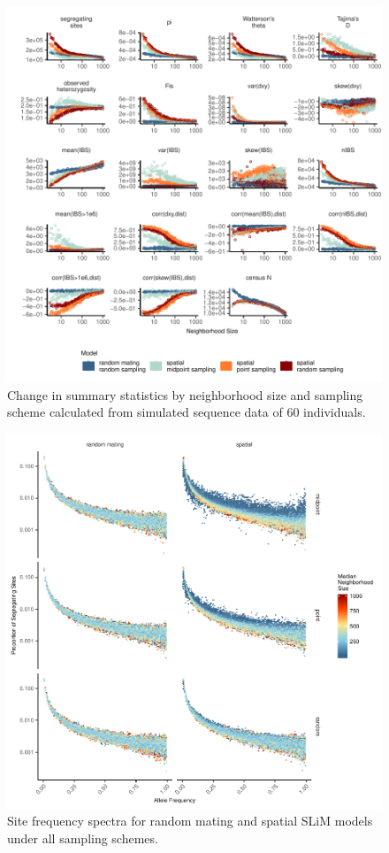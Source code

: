 \documentclass[9pt,twocolumn,twoside,lineno]{gsajnl}
\begin{document}
\afterpage{\clearpage}
\begin{figure}[p]
\centering
\includegraphics[width=\textwidth]{sumstats_by_neighbors_allstats.pdf}
\caption{Change in summary statistics by neighborhood size and sampling scheme calculated from simulated sequence data of 60 individuals.}
\label{fig:spectrum} 
\end{figure}


\afterpage{\clearpage}
\begin{figure}[p]
\centering
\includegraphics[width=\textwidth]{fig_S1_sfs_grid_model_by_sampling.pdf}
\caption{Site frequency spectra for random mating and spatial SLiM models under all sampling schemes.}
\label{fig:spectrum}
\end{figure}
\end{document}
